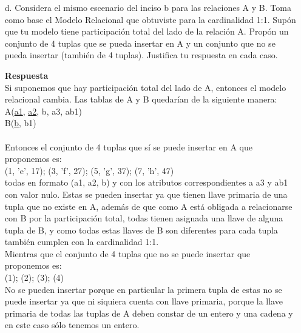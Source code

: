 \documentclass[12pt,a4paper]{article}
\begin{document}
\begin{enumerate}
\begin{enumerate}
				(b, b1, a1, a2) $\sim$ (entero, cadena, entero, cadena) \\
				\textbf{iv.} Este conjunto no se puede insertar, ya que aunque como en el conjunto anterior, las tuplas están en un formato válido para la inserción en B respecto a los dominios ((entero, cadena, entero, cadena)), como hay más de 3 atributos, necesariamente debe haber llaves para una tupla de A, y en ninguna tupla de este conjunto las hay (aún si supusiéramos que las llaves de A correspondientes a a2 son 'a', 'b', 'c'. 'd'), en particular en la primera tupla no hay ninguna combinación entero-cadena que cumpla ser llave de una tupla válida de A. Por ejemplo (8, 'a'), (8, 'f') no es llave de ninguna tupla de A.

			\item[d.] Considera el mismo escenario del inciso b para las relaciones A y B.
				Toma como base el Modelo Relacional que obtuviste para la cardinalidad 1:1.
				Supón que tu modelo tiene participación total del lado de la relación A.
				Propón un conjunto de 4 tuplas que se pueda insertar en A y un conjunto que no se pueda insertar
				(también de 4 tuplas). Justifica tu respuesta en cada caso.
				
				\textbf{Respuesta}\\
			    Si suponemos que hay participación total del lado de A, entonces el modelo relacional cambia. Las tablas de A y B quedarían de la siguiente manera:\\
			    A(\underline{a1}, \underline{a2}, b, a3, ab1)\\
				B(\underline{b}, b1)\\\\
				Entonces el conjunto de 4 tuplas que sí se puede insertar en A que proponemos es:\\
				(1, 'e', 17); (3, 'f', 27); (5, 'g', 37); (7, 'h', 47)\\
				todas en formato (a1, a2, b) y con los atributos correspondientes a a3 y ab1 con valor nulo. Estas se pueden insertar ya que tienen llave primaria de una tupla que no existe en A, además de que como A está obligada a relacionarse con B por la participación total, todas tienen asignada una llave de alguna tupla de B, y como todas estas llaves de B son diferentes para cada tupla también cumplen con la cardinalidad 1:1.\\
				Mientras que el conjunto de 4 tuplas que no se puede insertar que proponemos es:\\
				(1); (2); (3); (4)\\
				No se pueden insertar porque en particular la primera tupla de estas no se puede insertar ya que ni siquiera cuenta con llave primaria, porque la llave primaria de todas las tuplas de A deben constar de un entero y una cadena y en este caso sólo tenemos un entero.
		\end{enumerate}


\end{enumerate}
\end{document}

